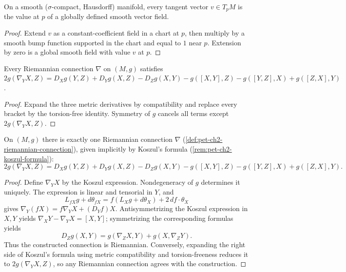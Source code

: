 \begin{lemma}
  \label{lem:pet-ch2-extend-tangent-vector}
  \leanok
  On a smooth ($\sigma$-compact, Hausdorff) manifold, every tangent vector
  $v\in T_pM$ is the value at $p$ of a globally defined smooth vector field.
\end{lemma}
\begin{proof}
  \leanok
  \sketch
  Extend $v$ as a constant-coefficient
  field in a chart at $p$, then multiply by a smooth bump function supported
  in the chart and equal to $1$ near $p$. Extension by zero is a global
  smooth field with value $v$ at $p$.
\end{proof}

\begin{lemma}
  \label{lem:pet-ch2-riemannian-connection-koszul}
  \leanok
  Every Riemannian connection $\nabla$ on $(M,g)$ satisfies
  $2g(\nabla_YX,Z)=D_Xg(Y,Z)+D_Yg(X,Z)-D_Zg(X,Y)
  -g([X,Y],Z)-g([Y,Z],X)+g([Z,X],Y)$.
\end{lemma}
\begin{proof}
  \leanok
  \sketch
  Expand the three metric
  derivatives by compatibility and replace every bracket by the
  torsion-free identity. Symmetry of $g$ cancels all terms except
  $2g(\nabla_YX,Z)$.
\end{proof}

\begin{theorem}
  \label{thm:pet-ch2-fundamental-theorem}
  \leanok
  On $(M,g)$ there is exactly one Riemannian connection $\nabla$
  (\cref{def:pet-ch2-riemannian-connection}), given implicitly by Koszul's
  formula (\cref{rem:pet-ch2-koszul-formula}):
  \[
    2g(\nabla_YX,Z)=D_Xg(Y,Z)+D_Yg(X,Z)-D_Zg(X,Y)
    -g([X,Y],Z)-g([Y,Z],X)+g([Z,X],Y).
  \]
\end{theorem}
\begin{proof}
  \leanok
  \sketch
  Define $\nabla_YX$ by the Koszul
  expression. Nondegeneracy of $g$ determines it uniquely. The expression is
  linear and tensorial in $Y$, and
  \[
    L_{fX}g+d\theta_{fX}
      =f(L_Xg+d\theta_X)+2\,df\cdot\theta_X
  \]
  gives $\nabla_Y(fX)=f\nabla_YX+(D_Yf)X$. Antisymmetrizing the Koszul
  expression in $X,Y$ yields
  $\nabla_XY-\nabla_YX=[X,Y]$; symmetrizing the corresponding formulas yields
  \[
    D_Zg(X,Y)=g(\nabla_ZX,Y)+g(X,\nabla_ZY).
  \]
  Thus the constructed connection is Riemannian. Conversely, expanding the
  right side of Koszul's formula using metric compatibility and
  torsion-freeness reduces it to $2g(\nabla_YX,Z)$, so any Riemannian
  connection agrees with the construction.
\end{proof}

